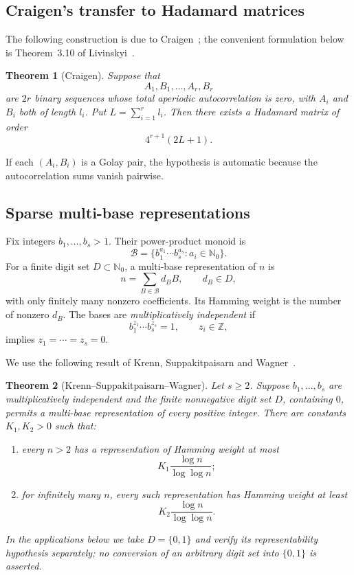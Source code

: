 \documentclass[11pt]{article}
\newtheorem{theorem}{Theorem}[section]
\newcommand{\N}{\mathbb{N}}
\begin{document}
\subsection{Craigen's transfer to Hadamard matrices}
The following construction is due to Craigen~\cite{Craigen1995}; the convenient formulation below is Theorem~3.10 of Livinskyi~\cite{Livinskyi2012}.

\begin{theorem}[Craigen]\label{thm:craigen-transfer}
Suppose that
\[
A_1,B_1,\ldots,A_r,B_r
\]
are $2r$ binary sequences whose total aperiodic autocorrelation is zero, with $A_i$ and $B_i$ both of length $l_i$.  Put $L=\sum_{i=1}^r l_i$.  Then there exists a Hadamard matrix of order
\[
4^{r+1}(2L+1).
\]
\end{theorem}

If each $(A_i,B_i)$ is a Golay pair, the hypothesis is automatic because the autocorrelation sums vanish pairwise.

\subsection{Sparse multi-base representations}
Fix integers $b_1,\ldots,b_s>1$.  Their power-product monoid is
\[
\mathcal B=\{b_1^{a_1}\cdots b_s^{a_s}:a_i\in\N_0\}.
\]
For a finite digit set $D\subset\N_0$, a multi-base representation of $n$ is
\[
 n=\sum_{B\in\mathcal B} d_BB,
 \qquad d_B\in D,
\]
with only finitely many nonzero coefficients.  Its Hamming weight is the number of nonzero $d_B$.  The bases are \emph{multiplicatively independent} if
\[
b_1^{z_1}\cdots b_s^{z_s}=1,\qquad z_i\in\mathbb Z,
\]
implies $z_1=\cdots=z_s=0$.

We use the following result of Krenn, Suppakitpaisarn and Wagner~\cite{Krenn2020}.

\begin{theorem}[Krenn--Suppakitpaisarn--Wagner]\label{thm:ksw}
Let $s\ge2$.  Suppose $b_1,\ldots,b_s$ are multiplicatively independent and the finite nonnegative digit set $D$, containing $0$, permits a multi-base representation of every positive integer.  There are constants $K_1,K_2>0$ such that:
\begin{enumerate}[label=(\roman*),leftmargin=2em]
\item every $n>2$ has a representation of Hamming weight at most
\[
K_1\frac{\log n}{\log\log n};
\]
\item for infinitely many $n$, every such representation has Hamming weight at least
\[
K_2\frac{\log n}{\log\log n}.
\]
\end{enumerate}
In the applications below we take $D=\{0,1\}$ and verify its representability hypothesis separately; no conversion of an arbitrary digit set into $\{0,1\}$ is asserted.
\end{theorem}
\end{document}
